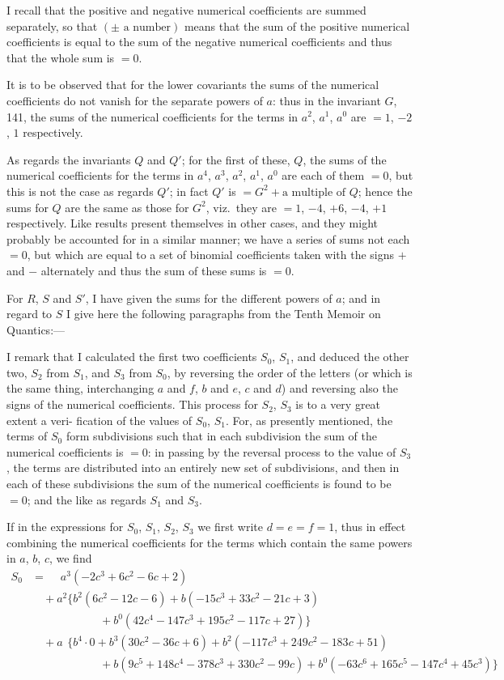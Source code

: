 \documentclass[11pt,a4paper]{book}
\begin{document}
\begin{center}
I recall that the positive and negative numerical coefficients are summed separately, so that $(\pm\text{ a number})$
means that the sum of the positive numerical coefficients is equal to the sum of the
negative numerical coefficients and thus that the whole sum is $=0$.

It is to be observed that for the lower covariants the sums of the numerical
coefficients do not vanish for the separate powers of $a$: thus in the invariant $G$, 141,
the sums of the numerical coefficients for the terms in $a^2$, $a^1$, $a^0$ are $=1$, $-2$, $1$
respectively.

As regards the invariants $Q$ and $Q'$; for the first of these, $Q$, the sums of the
numerical coefficients for the terms in $a^4$, $a^3$, $a^2$, $a^1$, $a^0$ are each of them $=0$, but this
is not the case as regards $Q'$; in fact $Q'$ is $=G^2+\text{a multiple of }Q$; hence the sums
for $Q$ are the same as those for $G^2$, viz.\ they are $=1$, $-4$, $+6$, $-4$, $+1$ respectively.
Like results present themselves in other cases, and they might probably be accounted
for in a similar manner; we have a series of sums not each $=0$, but which are equal
to a set of binomial coefficients taken with the signs $+$ and $-$ alternately and thus
the sum of these sums is $=0$.

For $R$, $S$ and $S'$, I have given the sums for the different powers of $a$; and
in regard to $S$ I give here the following paragraphs from the Tenth Memoir on
Quantics:---

I remark that I calculated the first two coefficients $S_0$, $S_1$, and deduced the other
two, $S_2$ from $S_1$, and $S_3$ from $S_0$, by reversing the order of the letters (or which is
the same thing, interchanging $a$ and $f$, $b$ and $e$, $c$ and $d$) and reversing also the signs
of the numerical coefficients. This process for $S_2$, $S_3$ is to a very great extent a veri-
fication of the values of $S_0$, $S_1$. For, as presently mentioned, the terms of $S_0$ form
subdivisions such that in each subdivision the sum of the numerical coefficients is
$=0$: in passing by the reversal process to the value of $S_3$, the terms are distributed
into an entirely new set of subdivisions, and then in each of these subdivisions the
sum of the numerical coefficients is found to be $=0$; and the like as regards $S_1$ and $S_3$.

If in the expressions for $S_0$, $S_1$, $S_2$, $S_3$ we first write $d=e=f=1$, thus in effect
combining the numerical coefficients for the terms which contain the same powers in
$a$, $b$, $c$, we find
\begin{align*}
S_0 &= \phantom{+}a^3(-2c^3 + 6c^2 - 6c + 2)\\
  &\quad + a^2\{b^2(6c^2 - 12c - 6) + b(-15c^3 + 33c^2 - 21c + 3)\\
  &\qquad\qquad\qquad + b^0(42c^4 - 147c^3 + 195c^2 - 117c + 27)\}\\
  &\quad + a\phantom{^2}\{b^4\cdot 0 + b^3(30c^2 - 36c + 6) + b^2(-117c^3 + 249c^2 - 183c + 51)\\
  &\qquad\qquad\qquad + b(9c^5 + 148c^4 - 378c^3 + 330c^2 - 99c) + b^0(-63c^6 + 165c^5 - 147c^4 + 45c^3)\}
\end{align*}


\end{center}
\end{document}
